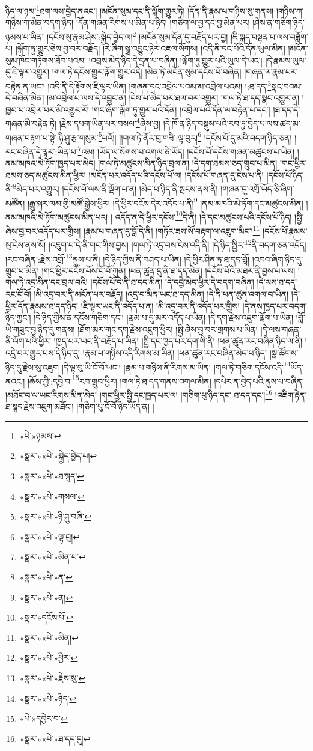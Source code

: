 ཉིད་ལ་ཉམ་\footnote{«པེ་»ཉམས་}ཐག་ལས་བྱེད་ནའང་། །མངོན་སུམ་དང་ནི་ལྐོག་གྱུར་ཏེ། །དོན་ནི་རྣམ་པ་གཉིས་སུ་གནས། །གཉིས་ཀ་གཉིས་ཀ་མིན་བདག་ཉིད། །དོན་གཞན་རིགས་པ་མིན་པ་ཉིད། །གཅིག་ལ་བྱ་དང་བྱ་མིན་པར། །ཤེས་ན་གཅིག་ཉིད་ཉམས་པ་ཡིན། །དངོས་སུ་རྣམ་ཤེས་:སྐྱེད་བྱེད་ལ།\footnote{«སྣར་»«པེ་»སྐྱེད་བྱེད་པ།} །མངོན་སུམ་དོན་དུ་བརྗོད་པར་བྱ། །ཇི་སྐད་བསྟན་པ་ལས་བཟློག་པ། །ལྐོག་ཏུ་གྱུར་ཅེས་བྱ་བར་བརྗོད། །རེ་ཞིག་སྒྲ་འབྱུང་ཉེར་འཇལ་སོགས། །འདི་ནི་དང་པོའི་དོན་ཡུལ་མིན། །མངོན་སུམ་ཁོང་གཏོགས་ཐོབ་པའམ། །འབྲས་མེད་ཉིད་དེ་དྲན་པ་བཞིན། །ལྐོག་ཏུ་གྱུར་པའི་ཡུལ་དེ་ཡང་། །དེ་རྣམས་ཡུལ་དུ་ཇི་ལྟར་འགྱུར། །གལ་ཏེ་དངོས་གྱུར་ལྐོག་གྱུར་འདི། །མིན་ཏེ་མངོན་སུམ་དངོས་པོ་བཞིན། །གཞན་ལ་རྣམ་པར་བརྟེན་ན་ཡང་། །འདི་ནི་དེ་རྟོགས་ཇི་ལྟར་ཡིན། །གཞན་དང་འབྲེལ་པའམ་མ་འབྲེལ་པའམ། །:ཐ་དད་\footnote{«སྣར་»«པེ་»ཐ་སྙད་}སྣང་བའམ་དེ་བཞིན་མིན། །མ་འབྲེལ་པ་ལས་དེ་འབྱུང་ན། །ངེས་པ་མེད་པར་ཐལ་བར་འགྱུར། །གལ་ཏེ་ཐ་དད་སྣང་འགྱུར་ན། །ཁྱབ་པ་འབྲེལ་པར་མི་འགྱུར་རོ། །གང་ཞིག་ལྐོག་ཏུ་གྱུར་པའི་དོན། །འབྲེལ་པའི་དོན་ལ་བརྟེན་པ་དང་། །ཐ་དད་དེ་གཞན་མི་བརྟེན་ཏེ། །རྗེས་དཔག་ཡིན་པར་བསལ་\footnote{«སྣར་»«པེ་»གསལ་}ཞེས་བྱ། །དེ་ཁོ་ན་ཉིད་བསྡུས་པའི་རབ་ཏུ་བྱེད་པ་ལས་ཚད་མ་གཞན་བརྟག་པ་སྟེ་:ཉི་ཤུ་རྩ་གསུམ་\footnote{«སྣར་»«པེ་»ཉི་ཤུ་བཞི་}པའོ།། །།གལ་ཏེ་ནོར་བུ་གཟི་:ལྟ་བུར།\footnote{«སྣར་»«པེ་»ལྟ་བུ།} །དངོས་པོ་དུ་མའི་བདག་ཉིད་ཅན། །རང་བཞིན་དེ་ལྟར་:ཡིན་པ་\footnote{«སྣར་»«པེ་»མིན་པ་}འམ། །ཡོད་ལ་སོགས་པ་འགལ་ཅི་ཡོད། །དངོས་པོ་དངོས་གཞན་མཚུངས་པ་ཡིན། །ནམ་མཁའ་མེ་ཏོག་ཁྱད་པར་མེད། །གལ་ཏེ་མཚུངས་མིན་ཉིད་བྲལ་ན། །དེ་དག་ཐམས་ཅད་གྲུབ་པ་མིན། །གང་ཕྱིར་ཐམས་ཅད་མཚུངས་མིན་ཕྱིར། །མངོན་པར་འདོད་པའི་དངོས་པོ་ལ། །དངོས་པོ་གཞན་དུ་ངེས་པ་ནི། །དངོས་པོ་ཉིད་ནི་\footnote{«སྣར་»«པེ་»ན་}མེད་པར་འགྱུར། །དངོས་པོ་ལས་ནི་ལྡོག་པ་ན། །མེད་པ་ཉིད་ནི་སྤངས་ནས་ནི། །གཞན་དུ་འགྲོ་ཡོད་ཅི་ཞིག་མཚོན། །རྒྱུ་སྐར་ལམ་གྱི་མཚོ་སྐྱེས་ཕྱིར། །དེ་ཕྱིར་དངོས་དེར་འདོད་པ་ནི།\footnote{«སྣར་»«པེ་»ན།} །ནམ་མཁའི་མེ་ཏོག་དང་མཚུངས་མིན། །ནམ་མཁའི་མེ་ཏོག་མཚུངས་མིན་པར། །
འདོད་ན་དེ་ཕྱིར་དངོས་\footnote{«སྣར་»དངོས་པོ་}དེ་ནི། །དེ་དང་མཚུངས་པའི་དངོས་པོ་ཉིད། །སྤྱི་ཞེས་བྱ་བར་འདོད་པར་གྱིས། །རྣམ་པ་གཞན་དུ་བློ་དེ་ནི། །གཏོར་ཟས་སོ་བརྟག་ལ་འཇུག་མིང་།\footnote{«སྣར་»«པེ་»མིན།} །དངོས་པོ་རྣམས་སུ་ངེས་ནས་སོ། །འཇུག་པ་དེ་ནི་གང་གིས་བྱས། །གལ་ཏེ་འདྲ་བས་ངེས་འདི་ནི། །དེ་ཉིད་སྤྱིར་\footnote{«སྣར་»«པེ་»ཕྱིར་}ནི་བདག་ཅན་འདོད། །རང་བཞིན་:རྗེས་འགྲོ་\footnote{«སྣར་»«པེ་»རྗེས་སུ་}ནུས་པ་ནི། །དེ་ཉིད་ཀྱིས་ནི་བཤད་པ་ཡིན། །དེ་ཕྱིར་ཤིན་ཏུ་ཐ་དད་བློ། །འབའ་ཞིག་ཉིད་དུ་གྲུབ་པ་མིན། །གང་ཕྱིར་དངོས་པོས་ངོ་བོ་ཀུན། །ཕན་ཚུན་དུ་ནི་ཐ་དད་མིན། །དངོས་པོའི་མཐར་ནི་བྱས་པ་ལས། །གལ་ཏེ་འདྲ་མིན་དང་བྲལ་བའི། །དངོས་པོ་དེ་ནི་ཐ་དད་མིན། །དེ་དབྱེ་མེད་ཕྱིར་དེ་བདག་བཞིན། །དེ་ལས་ཐ་དད་རང་ངོ་བོ། །མི་འདྲ་བར་ནི་མངོན་པར་བརྗོད། །འདྲ་བ་མིན་ཡང་ཐ་དད་མིན། །དེ་ནི་ཕན་ཚུན་འགལ་བ་ཡིན། །དེ་ཕྱིར་དོན་རྣམས་ཐ་དད་ཉིད། །ཇི་ལྟར་ཡང་ནི་འདོད་པ་ན། །མི་འདྲ་བར་ནི་འདོད་པར་གྱིས། །དེ་ནས་ཁྱད་པར་བདག་ཉིད་ཀྱང་། །དེ་ཉིད་ཀྱིས་ན་དངོས་གཅིག་དང་། །རྣམ་པ་དུ་མར་འདོད་པ་ཡིན། །དེ་དག་རྗེས་འཇུག་ལྡོག་པ་ཡིན། །བློ་ཡི་གཟུང་བྱ་ཉིད་དུ་གནས། །ཐོག་མར་གང་དག་རྗེས་འཇུག་ཕྱིར། །སྤྱི་ཞེས་བྱ་བར་གྲགས་པ་ཡིན། །དེ་ལས་གཞན་ནི་ལོག་པའི་ཕྱིར། །ཁྱད་པར་ཡང་ནི་བརྗོད་པ་ཡིན། །སྤྱི་དང་ཁྱད་པར་དག་གི་ནི། །ཕན་ཚུན་རང་བཞིན་ཉིད་ལ་ནི། །འདྲེ་བར་གྱུར་པས་དེ་ཉིད་དུ། །རྣམ་པ་གཉིས་འདི་རིགས་མ་ཡིན། །ཕན་ཚུན་རང་བཞིན་མེད་པ་ཉིད། །སྣ་ཚོགས་ཉིད་དུ་རྗེས་སུ་འཇུག །དེ་ལྟ་བུ་ཡི་ངོ་བོ་ཡང་། །རྣམ་པ་གཉིས་ནི་རིགས་མ་ཡིན། །གལ་ཏེ་གཅིག་དངོས་འདི་\footnote{«སྣར་»«པེ་»ཉིད་}ཡོད་ནའང་། །ཆོས་ཀྱི་:དབྱེ་བ་\footnote{«པེ་»དབྱེར་བ་}རབ་གྲུབ་ཕྱིར། །གལ་ཏེ་ཐ་དད་གནས་འགལ་མིན། །དཔེར་ན་བྱེད་པའི་ནུས་པ་བཞིན། །མཐོང་བ་ལ་ཡང་རིགས་མིན་མེད། །གང་ཕྱིར་སྤྱི་དང་ཁྱད་པར་ལ། །གཅིག་པུ་ཉིད་དང་:ཐ་དད་དང་།\footnote{«སྣར་»«པེ་»ཐ་དད་དུ།} །འཇིག་རྟེན་ཐ་སྙད་རྗེས་འཇུག་མཐོང་། །གཅིག་པུ་ངོ་བོ་ཉིད་ཡོད་ན། །

